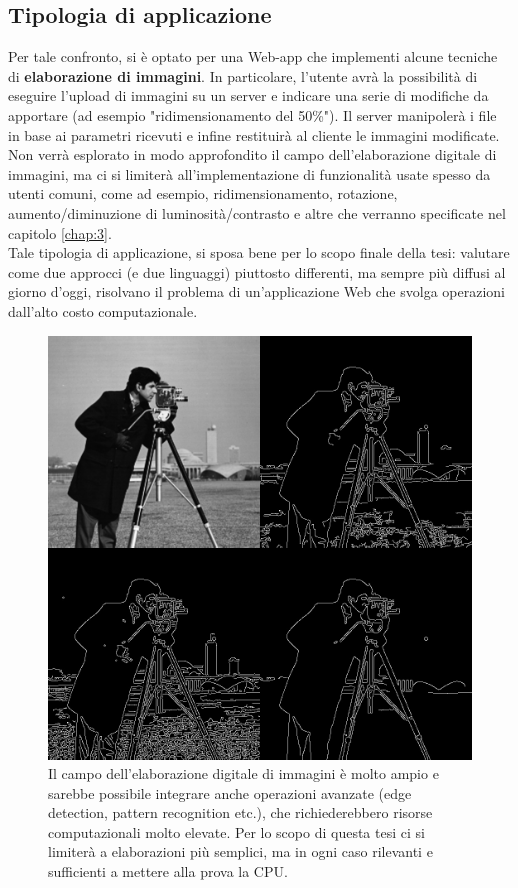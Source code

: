 \subsection{Tipologia di applicazione}
Per tale confronto, si è optato per una Web-app che implementi alcune tecniche di \textbf{elaborazione di immagini}.
In particolare, l'utente avrà la possibilità di eseguire l'upload di immagini su un server e indicare una serie di modifiche da apportare (ad esempio "ridimensionamento del 50\%"). Il server manipolerà i file in base ai parametri ricevuti e infine restituirà al cliente le immagini modificate.
\\Non verrà esplorato in modo approfondito il campo dell'elaborazione digitale di immagini, ma ci si limiterà all'implementazione di funzionalità usate spesso da utenti comuni, come ad esempio, ridimensionamento, rotazione, aumento/diminuzione di luminosità/contrasto e altre che verranno specificate nel capitolo \ref{chap:3}.
\\Tale tipologia di applicazione, si sposa bene per lo scopo finale della tesi: valutare come due approcci (e due linguaggi) piuttosto differenti, ma sempre più diffusi al giorno d'oggi, risolvano il problema di un'applicazione Web che svolga operazioni dall'alto costo computazionale.
\begin{figure}
        \begin{center}
                \includegraphics[width=0.55\columnwidth]{images/imageProc.jpg}
        \end{center}
        \caption[Image Processing]{Il campo dell'elaborazione digitale di immagini è molto ampio e sarebbe possibile integrare anche operazioni avanzate (edge detection, pattern recognition etc.), che richiederebbero risorse computazionali molto elevate. Per lo scopo di questa tesi ci si limiterà a elaborazioni più semplici, ma in ogni caso rilevanti e sufficienti a mettere alla prova la CPU.}
        \label{fig:imageProc}
\end{figure} 
